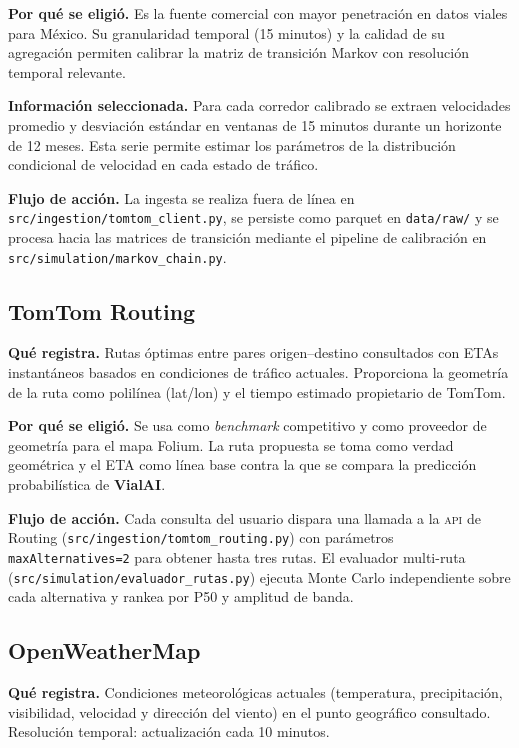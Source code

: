 \documentclass[11pt,a4paper]{article}
\newcommand{\VialAI}{\textbf{\textcolor{vialTeal}{Vial}\textcolor{vialAmber}{AI}}}
\begin{document}
\textbf{Por qué se eligió.} Es la fuente comercial con mayor
penetración en datos viales para México. Su granularidad temporal
(\num{15} minutos) y la calidad de su agregación permiten
calibrar la matriz de transición Markov con resolución temporal
relevante.

\textbf{Información seleccionada.} Para cada corredor calibrado
se extraen velocidades promedio y desviación estándar en ventanas
de \num{15} minutos durante un horizonte de \num{12} meses. Esta
serie permite estimar los parámetros de la distribución
condicional de velocidad en cada estado de tráfico.

\textbf{Flujo de acción.} La ingesta se realiza fuera de línea en
\texttt{src/ingestion/tomtom\_client.py}, se persiste como parquet
en \texttt{data/raw/} y se procesa hacia las matrices de
transición mediante el pipeline de calibración en
\texttt{src/simulation/markov\_chain.py}.

\subsection{TomTom Routing}

\textbf{Qué registra.} Rutas óptimas entre pares origen--destino
consultados con ETAs instantáneos basados en condiciones de
tráfico actuales. Proporciona la geometría de la ruta como
polilínea (lat/lon) y el tiempo estimado propietario de TomTom.

\textbf{Por qué se eligió.} Se usa como \emph{benchmark}
competitivo y como proveedor de geometría para el mapa Folium.
La ruta propuesta se toma como verdad geométrica y el ETA como
línea base contra la que se compara la predicción probabilística
de \VialAI.

\textbf{Flujo de acción.} Cada consulta del usuario dispara una
llamada a la \textsc{api} de Routing
(\texttt{src/ingestion/tomtom\_routing.py}) con parámetros
\texttt{maxAlternatives=2} para obtener hasta tres rutas. El
evaluador multi-ruta (\texttt{src/simulation/evaluador\_rutas.py})
ejecuta Monte Carlo independiente sobre cada alternativa y
rankea por P50 y amplitud de banda.

\subsection{OpenWeatherMap}

\textbf{Qué registra.} Condiciones meteorológicas actuales
(temperatura, precipitación, visibilidad, velocidad y dirección
del viento) en el punto geográfico consultado. Resolución
temporal: actualización cada \num{10} minutos.
\end{document}
